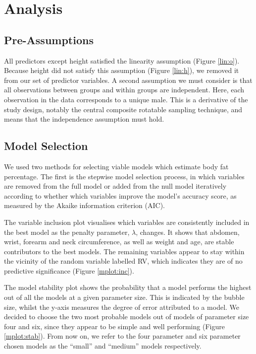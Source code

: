 \documentclass[letterpaper,9pt,twocolumn,twoside,]{pinp}
\begin{document}
\hypertarget{analysis}{%
\section{Analysis}\label{analysis}}

\hypertarget{pre-assumptions}{%
\subsection{Pre-Assumptions}\label{pre-assumptions}}

All predictors except height satisfied the linearity assumption (Figure
\ref{lin:o}). Because height did not satisfy this assumption (Figure
\ref{lin:h}), we removed it from our set of predictor variables. A
second assumption we must consider is that all observations between
groups and within groups are independent. Here, each observation in the
data corresponds to a unique male. This is a derivative of the study
design, notably the central composite rotatable sampling technique, and
means that the independence assumption must hold.

\hypertarget{model-selection}{%
\subsection{Model Selection}\label{model-selection}}

We used two methods for selecting viable models which estimate body fat
percentage. The first is the stepwise model selection process, in which
variables are removed from the full model or added from the null model
iteratively according to whether which variables improve the model's
accuracy score, as measured by the Akaike information criterion (AIC).

The variable inclusion plot visualises which variables are consistently
included in the best model as the penalty parameter, \(\lambda\),
changes. It shows that abdomen, wrist, forearm and neck circumference,
as well as weight and age, are stable contributors to the best models.
The remaining variables appear to stay within the vicinity of the random
variable labelled RV, which indicates they are of no predictive
significance (Figure \ref{mplot:inc}).

The model stability plot shows the probability that a model performs the
highest out of all the models at a given parameter size. This is
indicated by the bubble size, whilst the y-axis measures the degree of
error attributed to a model. We decided to choose the two most probable
models out of models of parameter size four and six, since they appear
to be simple and well performing (Figure \ref{mplot:stab}). From now on,
we refer to the four parameter and six parameter chosen models as the
``small'' and ``medium'' models respectively.
\end{document}
